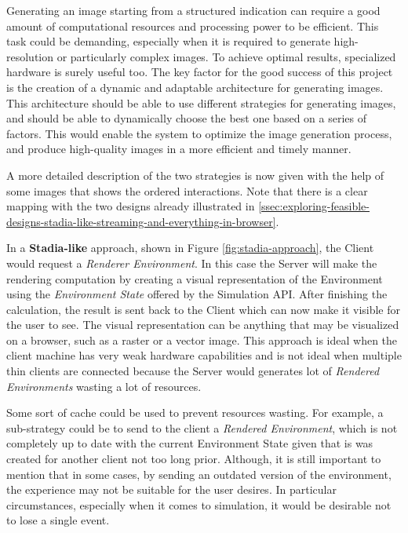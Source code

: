 Generating an image starting from a structured indication can require a good amount of computational resources and processing power to be efficient. This task could be demanding, especially when it is required to generate high-resolution or particularly complex images. To achieve optimal results, specialized hardware is surely useful too. The key factor for the good success of this project is the creation of a dynamic and adaptable architecture for generating images. This architecture should be able to use different strategies for generating images, and should be able to dynamically choose the best one based on a series of factors. This would enable the system to optimize the image generation process, and produce high-quality images in a more efficient and timely manner.\newline

\noindent A more detailed description of the two strategies is now given with the help of some images that shows the ordered interactions.  Note that there is a clear mapping with the two designs already illustrated in \ref{ssec:exploring-feasible-designs-stadia-like-streaming-and-everything-in-browser}.\newline

In a \textbf{Stadia-like} approach, shown in Figure \ref{fig:stadia-approach}, the Client would request a \textit{Renderer Environment}. In this case the Server will make the rendering computation by creating a visual representation of the Environment using the \textit{Environment State} offered by the Simulation API.
After finishing the calculation, the result is sent back to the Client which can now make it visible for the user to see. The visual representation can be anything that may be visualized on a browser, such as a raster or a vector image. This approach is ideal when the client machine has very weak hardware capabilities and is not ideal when multiple thin clients are connected because the Server would generates lot of \textit{Rendered Environments} wasting a lot of resources.


\begin{warn}[Note:]
	Some sort of cache could be used to prevent resources wasting.
	For example, a sub-strategy could be to send to the client a \textit{Rendered Environment}, which is not completely up to date with the current Environment State given that is was created for another client not too long prior. Although, it is still important to mention that in some cases, by sending an outdated version of the environment, the experience may not be suitable for the user desires. In particular circumstances, especially when it comes to simulation, it would be desirable not to lose a single event.
\end{warn}

